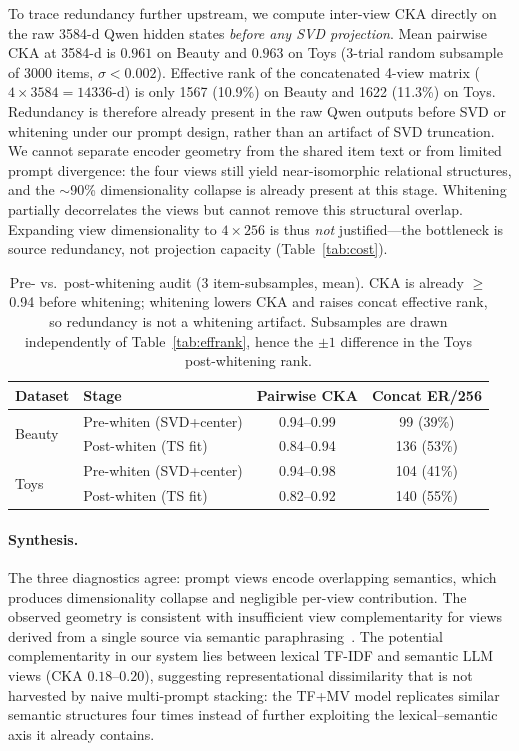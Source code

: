 \documentclass[sigconf,natbib=true,anonymous]{acmart}
\newcommand{\tfidf}{\textsc{TF-IDF}\xspace}
\newcommand{\llm}{\textsc{LLM}\xspace}
\newcommand{\tfmv}{\textsc{TF+MV}\xspace}
\begin{document}
To trace redundancy further upstream, we compute inter-view CKA directly on the raw 3584-d Qwen hidden states \emph{before any SVD projection}.
Mean pairwise CKA at 3584-d is $0.961$ on Beauty and $0.963$ on Toys (3-trial random subsample of 3000 items, $\sigma < 0.002$).
Effective rank of the concatenated 4-view matrix ($4\times 3584 = 14336$-d) is only 1567 (10.9\%) on Beauty and 1622 (11.3\%) on Toys.
Redundancy is therefore already present in the raw Qwen outputs before SVD or whitening under our prompt design, rather than an artifact of SVD truncation.
We cannot separate encoder geometry from the shared item text or from limited prompt divergence: the four views still yield near-isomorphic relational structures, and the $\sim$90\% dimensionality collapse is already present at this stage.
Whitening partially decorrelates the views but cannot remove this structural overlap.
Expanding view dimensionality to $4\times256$ is thus \emph{not} justified---the bottleneck is source redundancy, not projection capacity (Table~\ref{tab:cost}).

\begin{table}[t]
\centering
\caption{%
Pre- vs.\ post-whitening audit (3 item-subsamples, mean).
CKA is already $\ge$0.94 before whitening; whitening lowers CKA and raises concat effective rank, so redundancy is not a whitening artifact.
Subsamples are drawn independently of Table~\ref{tab:effrank}, hence the $\pm 1$ difference in the Toys post-whitening rank.%
}
\label{tab:cka-prepost}
\small
\begin{tabular}{@{}llcc@{}}
\toprule
Dataset & Stage & Pairwise CKA & Concat ER/256 \\
\midrule
\multirow{2}{*}{Beauty}
 & Pre-whiten (SVD+center)  & 0.94--0.99 & 99 (39\%) \\
 & Post-whiten (TS fit)     & 0.84--0.94 & 136 (53\%) \\
\midrule
\multirow{2}{*}{Toys}
 & Pre-whiten (SVD+center)  & 0.94--0.98 & 104 (41\%) \\
 & Post-whiten (TS fit)     & 0.82--0.92 & 140 (55\%) \\
\bottomrule
\end{tabular}
\end{table}

\paragraph{Synthesis.}
The three diagnostics agree: prompt views encode overlapping semantics, which produces dimensionality collapse and negligible per-view contribution.
The observed geometry is consistent with insufficient view complementarity for views derived from a single source via semantic paraphrasing~\cite{xu2013multiview}.
The potential complementarity in our system lies between lexical \tfidf and semantic \llm views (CKA $0.18$--$0.20$), suggesting representational dissimilarity that is not harvested by naive multi-prompt stacking: the \tfmv model replicates similar semantic structures four times instead of further exploiting the lexical--semantic axis it already contains.
\end{document}
